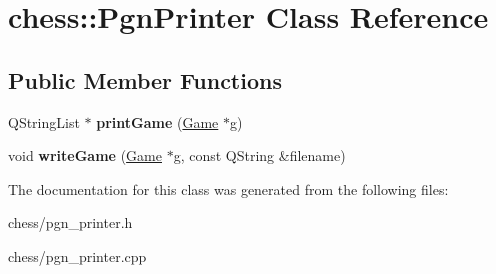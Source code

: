 \hypertarget{classchess_1_1PgnPrinter}{\section{chess\-:\-:Pgn\-Printer Class Reference}
\label{classchess_1_1PgnPrinter}
}
\subsection*{Public Member Functions}
\begin{DoxyCompactItemize}
\item 
\hypertarget{classchess_1_1PgnPrinter_a7d6e8483b5cbb4452bfa68baa0378b28}{Q\-String\-List $\ast$ {\bfseries print\-Game} (\hyperlink{classchess_1_1Game}{Game} $\ast$g)}\label{classchess_1_1PgnPrinter_a7d6e8483b5cbb4452bfa68baa0378b28}

\item 
\hypertarget{classchess_1_1PgnPrinter_a764ed0214418e2fbab5fe6f3b499e573}{void {\bfseries write\-Game} (\hyperlink{classchess_1_1Game}{Game} $\ast$g, const Q\-String \&filename)}\label{classchess_1_1PgnPrinter_a764ed0214418e2fbab5fe6f3b499e573}

\end{DoxyCompactItemize}


The documentation for this class was generated from the following files\-:\begin{DoxyCompactItemize}
\item 
chess/pgn\-\_\-printer.\-h\item 
chess/pgn\-\_\-printer.\-cpp\end{DoxyCompactItemize}
